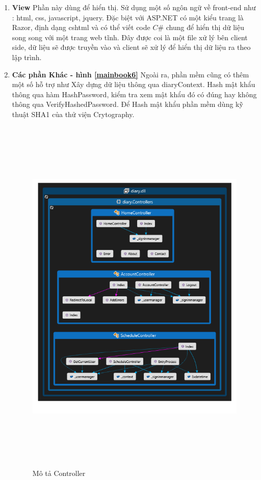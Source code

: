 \documentclass[a4paper]{article}
\begin{document}
\begin{enumerate}
\begin{itemize}
	\end{itemize}

	\item \textbf{View}
		Phần này dùng để hiển thị. Sử dụng một số ngôn ngữ về front-end như : html, css,  javascript, jquery. Đặc biệt với ASP.NET có một kiểu trang là Razor, định dạng cshtml và có thể viết code \(C\#\) chung để hiển thị dữ liệu song song với một trang web tĩnh. Đây được coi là một file xử lý bên client side, dữ liệu sẽ được truyền vào và client sẽ xử lý để hiển thị dữ liệu ra theo lập trình.

	\item \textbf{Các phần Khác - hình \ref{mainbook6}}
	Ngoài ra, phần mềm cũng có thêm một số hỗ trợ như Xây dựng dữ liệu thông qua diaryContext. Hash mật khẩu thông qua hàm HashPassword, kiểm tra xem mật khẩu đó có đúng hay không thông qua VerifyHashedPassword. Để Hash mật khẩu phần mềm dùng kỹ thuật SHA1 của thử viện Crytography.

	\newpage


			\begin{figure}[!h]
	 			\centering
      			\includegraphics[height=500pt,width=440pt]{Images/h3.png}
	 		 	\caption{Mô tả Controller}
	 		 	\label{mainbook5}
	  		\end{figure}



\end{enumerate}
\end{document}
